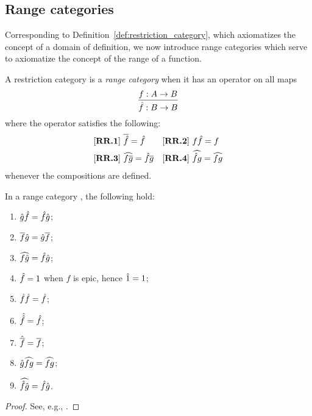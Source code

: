 \subsection{Range categories} %
\label{sub:range_categories}
Corresponding to Definition~\ref{def:restriction_category}, which axiomatizes the concept of a
domain of definition, we now introduce range categories which serve to axiomatize the concept of
the range of a function.

\begin{definition}\label{def:range_category}
  A restriction category \X is a \emph{range category} when it has an operator on all maps
  \[
    \infer{\rg{f}:B\to B}{f:A\to B}
  \]
  where the operator satisfies the following:
  \begin{align*}
    &[\text{\bfseries {RR}.{1}}]\ \overline{\hat{f}} = \hat{f} & &
     [\text{\bfseries {RR}.{2}}]\ f \hat{f} = f\\
    &[\text{\bfseries {RR}.{3}}]\ \widehat{f\overline{g}} = \hat{f} \overline{g} & &
     [\text{\bfseries {RR}.{4}}]\  \widehat{\hat{f}g} = \widehat{f g}
  \end{align*}
  whenever the compositions are defined.

\end{definition}

\begin{lemma}\label{lem:basic_range_category_properties}
  In a range category \X, the following hold:
  \begin{multicols}{2}
    \begin{enumerate}[{(}i{)}]
      \item $\hat{g}\hat{f} = \hat{f}\hat{g}$;
      \item $\overline{f}\hat{g} = \hat{g}\overline{f}$;
      \item $\widehat{f\hat{g}} = \hat{f}\hat{g}$;
      \item $\hat{f} = 1$ when $f$ is epic, hence $\hat{1} = 1$;
      \item $\hat{f}\hat{f} = \hat{f}$;
      \item $\hat{\hat{f}} = \hat{f}$;
      \item $\hat{\overline{f}} = \overline{f}$;
      \item $\hat{g}\widehat{f g} = \widehat{f g}$;
      \item $\widehat{\hat{f}\hat{g}} = \hat{f}\hat{g}$.
    \end{enumerate}
  \end{multicols}
\end{lemma}
\begin{proof}
  See, e.g., \cite{guox:thesis}.
\end{proof}

